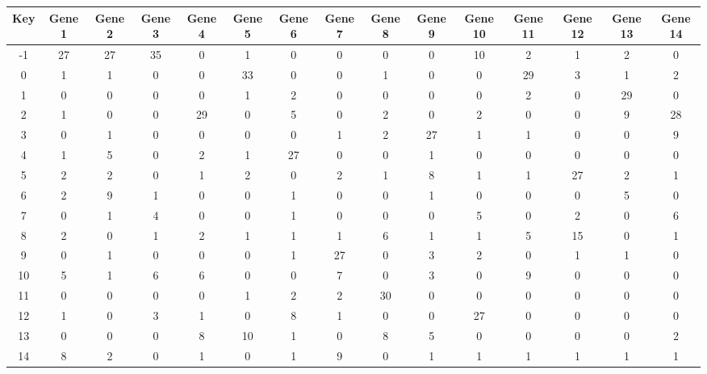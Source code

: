\begin{tabular}{|c|c|c|c|c|c|c|c|c|c|c|c|c|c|c|}
\hline
Key & Gene 1 & Gene 2 & Gene 3 & Gene 4 & Gene 5 & Gene 6 & Gene 7 & Gene 8 & Gene 9 & Gene 10 & Gene 11 & Gene 12 & Gene 13 & Gene 14 \\
\hline
-1 & 27 & 27 & 35 & 0 & 1 & 0 & 0 & 0 & 0 & 10 & 2 & 1 & 2 & 0 \\
0 & 1 & 1 & 0 & 0 & 33 & 0 & 0 & 1 & 0 & 0 & 29 & 3 & 1 & 2 \\
1 & 0 & 0 & 0 & 0 & 1 & 2 & 0 & 0 & 0 & 0 & 2 & 0 & 29 & 0 \\
2 & 1 & 0 & 0 & 29 & 0 & 5 & 0 & 2 & 0 & 2 & 0 & 0 & 9 & 28 \\
3 & 0 & 1 & 0 & 0 & 0 & 0 & 1 & 2 & 27 & 1 & 1 & 0 & 0 & 9 \\
4 & 1 & 5 & 0 & 2 & 1 & 27 & 0 & 0 & 1 & 0 & 0 & 0 & 0 & 0 \\
5 & 2 & 2 & 0 & 1 & 2 & 0 & 2 & 1 & 8 & 1 & 1 & 27 & 2 & 1 \\
6 & 2 & 9 & 1 & 0 & 0 & 1 & 0 & 0 & 1 & 0 & 0 & 0 & 5 & 0 \\
7 & 0 & 1 & 4 & 0 & 0 & 1 & 0 & 0 & 0 & 5 & 0 & 2 & 0 & 6 \\
8 & 2 & 0 & 1 & 2 & 1 & 1 & 1 & 6 & 1 & 1 & 5 & 15 & 0 & 1 \\
9 & 0 & 1 & 0 & 0 & 0 & 1 & 27 & 0 & 3 & 2 & 0 & 1 & 1 & 0 \\
10 & 5 & 1 & 6 & 6 & 0 & 0 & 7 & 0 & 3 & 0 & 9 & 0 & 0 & 0 \\
11 & 0 & 0 & 0 & 0 & 1 & 2 & 2 & 30 & 0 & 0 & 0 & 0 & 0 & 0 \\
12 & 1 & 0 & 3 & 1 & 0 & 8 & 1 & 0 & 0 & 27 & 0 & 0 & 0 & 0 \\
13 & 0 & 0 & 0 & 8 & 10 & 1 & 0 & 8 & 5 & 0 & 0 & 0 & 0 & 2 \\
14 & 8 & 2 & 0 & 1 & 0 & 1 & 9 & 0 & 1 & 1 & 1 & 1 & 1 & 1 \\
\hline
\end{tabular}